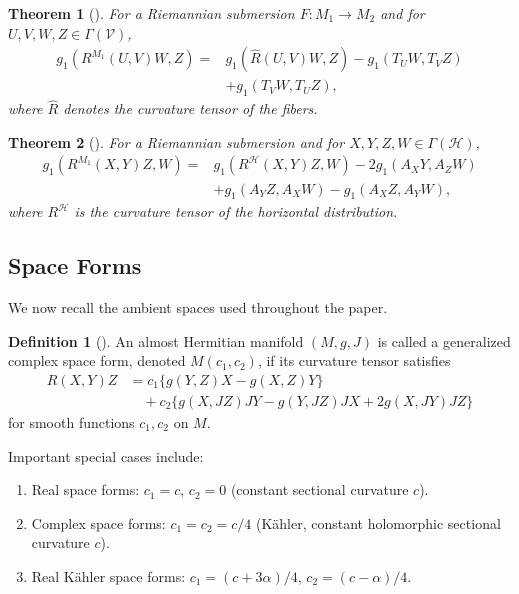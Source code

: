 \documentclass[11pt]{amsart}
\theoremstyle{plain}
\newtheorem{theorem}{Theorem}[section]
\theoremstyle{definition}
\newtheorem{definition}[proposition]{Definition}
\theoremstyle{remark}
\newcommand{\calH}{\mathcal{H}}
\newcommand{\calV}{\mathcal{V}}
\begin{document}
\begin{theorem}[\cite{Falcitelli2004}]\label{thm:gauss_vertical}
For a Riemannian submersion $F: M_1 \to M_2$ and for 
$U,V,W,Z \in \Gamma(\calV)$,
\begin{align}\label{eq:gauss_vertical}
g_1(R^{M_1}(U,V)W,Z) = & g_1(\hat{R}(U,V)W,Z)- g_1(T_U W, T_V Z) \nonumber\\
& + g_1(T_V W, T_U Z),
\end{align}
where $\hat{R}$ denotes the curvature tensor of the fibers.
\end{theorem}

\begin{theorem}[\cite{Falcitelli2004}]
\label{thm:gauss_horizontal}
For a Riemannian submersion and for 
$X,Y,Z,W \in \Gamma(\calH)$,
\begin{align}\label{eq:gauss_horizontal}
g_1(R^{M_1}(X,Y)Z,W) = &g_1(R^{\calH}(X,Y)Z,W)- 2g_1(A_X Y, A_Z W) \nonumber\\
& + g_1(A_Y Z, A_X W) 
 - g_1(A_X Z, A_Y W),
\end{align}
where $R^{\calH}$ is the curvature tensor of the horizontal 
distribution.
\end{theorem}

\subsection{Space Forms}

We now recall the ambient spaces used throughout the paper.

\begin{definition}[\cite{Olszak1989, Tricerri1981}]
\label{def:gen_complex_space_form}
An almost Hermitian manifold $(M,g,J)$ is called a 
{generalized complex space form}, denoted $M(c_1,c_2)$, 
if its curvature tensor satisfies
\begin{align}\label{eq:gen_complex_curvature}
R(X,Y)Z &= c_1\{g(Y,Z)X - g(X,Z)Y\} \nonumber\\
&\quad + c_2\{g(X,JZ)JY - g(Y,JZ)JX 
            + 2g(X,JY)JZ\}
\end{align}
for smooth functions $c_1, c_2$ on $M$.
\end{definition}

Important special cases include:
\begin{enumerate}[label=(\roman*)]
\item {Real space forms}: $c_1 = c$, $c_2 = 0$ 
      (constant sectional curvature $c$).
\item {Complex space forms}: $c_1 = c_2 = c/4$ 
      (K\"{a}hler, constant holomorphic sectional curvature $c$).
\item {Real K\"{a}hler space forms}: 
      $c_1 = (c+3\alpha)/4$, $c_2 = (c-\alpha)/4$.
\end{enumerate}
\end{document}

